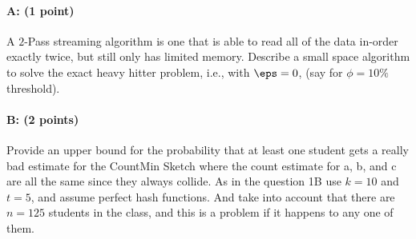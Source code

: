 \documentclass[11pt]{article}
\begin{document}
\paragraph{A: (1 point)}
A $2$-Pass streaming algorithm is one that is able to read all of the data in-order exactly twice, but still only has limited memory.  Describe a small space algorithm to solve the exact heavy hitter problem, i.e., with $\eps =0$, (say for $\phi = 10\%$ threshold).  


\paragraph{B: (2 points)}
Provide an upper bound for the probability that at least one student gets a really bad estimate for the CountMin Sketch where the count estimate for \textsf{a}, \textsf{b}, and \textsf{c} are all the same since they always collide.  As in the question 1B use $k=10$ and $t=5$, and assume perfect hash functions.  And take into account that there are $n=125$ students in the class, and this is a problem if it happens to any one of them.  
\end{document}
